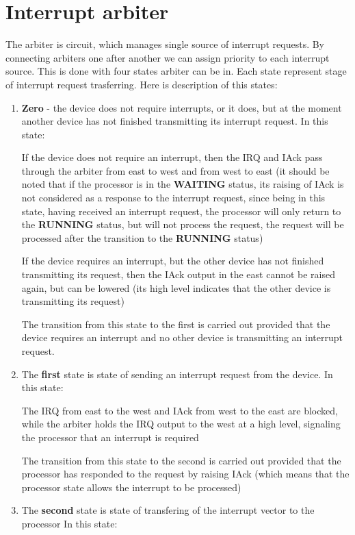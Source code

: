 \section*{Interrupt arbiter}

The arbiter is circuit, which manages single source of interrupt requests. By connecting arbiters one after another we can assign priority to each interrupt source. This is done with four states arbiter can be in. Each state represent stage of interrupt request trasferring. Here is description of this states:

\begin{enumerate}
	\item \textbf{Zero} - the device does not require interrupts, or it does, but at the moment another device has not finished transmitting its interrupt request. In this state:

		If the device does not require an interrupt, then the IRQ and IAck pass through the arbiter from east to west and from west to east (it should be noted that if the processor is in the \textbf{WAITING} status, its raising of IAck is not considered as a response to the interrupt request, since being in this state, having received an interrupt request, the processor will only return to the \textbf{RUNNING} status, but will not process the request, the request will be processed after the transition to the \textbf{RUNNING} status)

		If the device requires an interrupt, but the other device has not finished transmitting its request, then the IAck output in the east cannot be raised again, but can be lowered (its high level indicates that the other device is transmitting its request)

		The transition from this state to the first is carried out provided that the device requires an interrupt and no other device is transmitting an interrupt request.
	\item The \textbf{first} state is state of sending an interrupt request from the device.
		In this state:

		The IRQ from east to the west and IAck from west to the east are blocked, while the arbiter holds the IRQ output to the west at a high level, signaling the processor that an interrupt is required

		The transition from this state to the second is carried out provided that the processor has responded to the request by raising IAck (which means that the processor state allows the interrupt to be processed)
	\item The \textbf{second} state is state of transfering of the interrupt vector to the processor
		In this state:


\end{enumerate}
